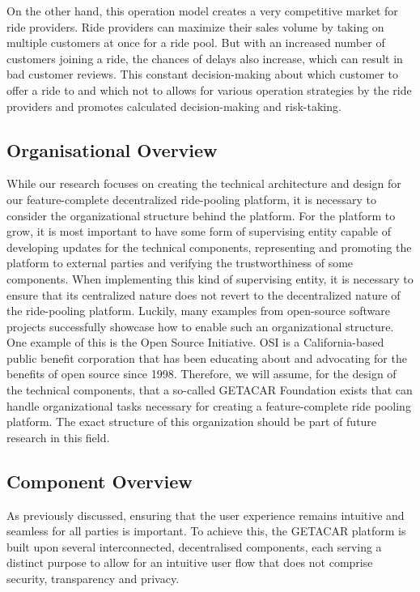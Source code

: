On the other hand, this operation model creates a very competitive market for ride providers. Ride providers can maximize their sales volume by taking on multiple customers at once for a ride pool. But with an increased number of customers joining a ride, the chances of delays also increase, which can result in bad customer reviews. This constant decision-making about which customer to offer a ride to and which not to allows for various operation strategies by the ride providers and promotes calculated decision-making and risk-taking. 

\subsection{Organisational Overview}\label{subsec:OrganisationalOverview}
While our research focuses on creating the technical architecture and design for our feature-complete decentralized ride-pooling platform, it is necessary to consider the organizational structure behind the platform. For the platform to grow, it is most important to have some form of supervising entity capable of developing updates for the technical components, representing and promoting the platform to external parties and verifying the trustworthiness of some components. When implementing this kind of supervising entity, it is necessary to ensure that its centralized nature does not revert to the decentralized nature of the ride-pooling platform. Luckily, many examples from open-source software projects successfully showcase how to enable such an organizational structure. One example of  this is the Open Source Initiative. OSI is a California-based public benefit corporation that has been educating about and advocating for the benefits of open source since 1998. Therefore, we will assume, for the design of the technical components, that a so-called GETACAR Foundation exists that can handle organizational tasks necessary for creating a feature-complete ride pooling platform. The exact structure of this organization should be part of future research in this field.

\subsection{Component Overview}\label{subsec:ComponentOverview}
As previously discussed, ensuring that the user experience remains intuitive and seamless for all parties is important. To achieve this, the GETACAR platform is built upon several interconnected, decentralised components, each serving a distinct purpose to allow for an intuitive user flow that does not comprise security, transparency and privacy.

